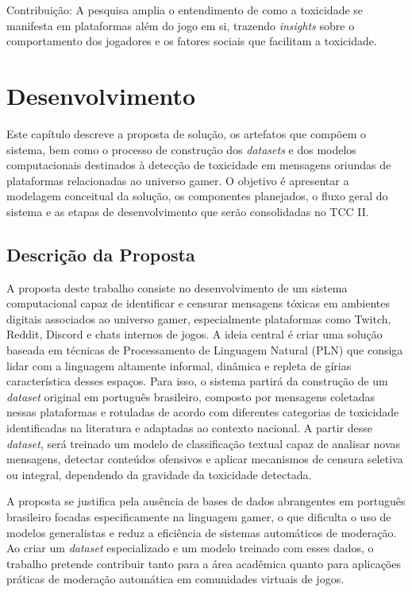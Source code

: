 \documentclass{eic-bcc-tcc}
\begin{document}
Contribuição: A pesquisa amplia o entendimento de como a toxicidade se manifesta em plataformas além do jogo em si, trazendo \textit{insights} sobre o comportamento dos jogadores e os fatores sociais que facilitam a toxicidade.

\chapter{Desenvolvimento}
\label{cha:desenvolvimento}

Este capítulo descreve a proposta de solução, os artefatos que compõem o sistema, bem como o processo de construção dos \textit{datasets} e dos modelos computacionais destinados à detecção de toxicidade em mensagens oriundas de plataformas relacionadas ao universo gamer. O objetivo é apresentar a modelagem conceitual da solução, os componentes planejados, o fluxo geral do sistema e as etapas de desenvolvimento que serão consolidadas no TCC II.

\section{Descrição da Proposta}

A proposta deste trabalho consiste no desenvolvimento de um sistema computacional capaz de identificar e censurar mensagens tóxicas em ambientes digitais associados ao universo gamer, especialmente plataformas como Twitch, Reddit, Discord e chats internos de jogos. A ideia central é criar uma solução baseada em técnicas de Processamento de Linguagem Natural (PLN) que consiga lidar com a linguagem altamente informal, dinâmica e repleta de gírias característica desses espaços. Para isso, o sistema partirá da construção de um \textit{dataset} original em português brasileiro, composto por mensagens coletadas nessas plataformas e rotuladas de acordo com diferentes categorias de toxicidade identificadas na literatura e adaptadas ao contexto nacional. A partir desse \textit{dataset}, será treinado um modelo de classificação textual capaz de analisar novas mensagens, detectar conteúdos ofensivos e aplicar mecanismos de censura seletiva ou integral, dependendo da gravidade da toxicidade detectada.

A proposta se justifica pela ausência de bases de dados abrangentes em português brasileiro focadas especificamente na linguagem gamer, o que dificulta o uso de modelos generalistas e reduz a eficiência de sistemas automáticos de moderação. Ao criar um \textit{dataset} especializado e um modelo treinado com esses dados, o trabalho pretende contribuir tanto para a área acadêmica quanto para aplicações práticas de moderação automática em comunidades virtuais de jogos.
\end{document}
